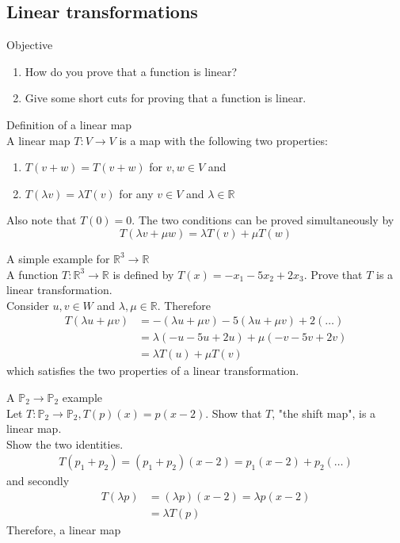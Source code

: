 \documentclass[journal, letterpaper]{IEEEtran}
\begin{document}
    \subsection{Linear transformations}
    \begin{mybox}{Objective}
        \begin{enumerate}
            \item How do you prove that a function is linear?
            \item Give some short cuts for proving that a function is linear.
        \end{enumerate}
    \end{mybox}
    \begin{mybox}{Definition of a linear map} \\ 
        A linear map $T : V \to V$ is a map with the following two properties:
        \begin{enumerate}
            \item $T(v + w) = T(v + w)$ for $v, w  \in V$ and
            \item $T(\lambda v) = \lambda T(v)$ for any $v \in V$ and $\lambda \in \mathbb{R}$
        \end{enumerate}
        Also note that $T(0) = 0$. The two conditions can be proved simultaneously by
        $$ T(\lambda v + \mu w) = \lambda T(v) + \mu T(w)$$
    \end{mybox}
    \newpage
    \begin{myboxg}{A simple example for $\mathbb{R}^3 \to \mathbb{R}$} \\ 
        A function $T : \mathbb{R}^3 \to \mathbb{R}$ is defined by $T(x) = -x_1 - 5x_2 + 2x_3$. Prove that $T$ is a linear transformation.
        \newline \\ 
        Consider $u, v \in W$ and $\lambda, \mu \in \mathbb{R}$. Therefore
        \begin{align*}
    T(\lambda u + \mu v) &= -(\lambda u + \mu v) -5(\lambda u + \mu v) + 2(\dots ) \\ 
    &= \lambda(-u - 5u + 2u) + \mu(-v - 5v + 2v) \\
    &= \lambda T(u) + \mu T(v)
        \end{align*}
        which satisfies the two properties of a linear transformation.
    \end{myboxg}
    \begin{myboxg}{A $\mathbb{P}_2 \to \mathbb{P}_2$ example} \\ 
        Let $T : \mathbb{P}_2 \to \mathbb{P}_2, T(p)(x) = p(x - 2)$. Show that $T$, "the shift map", is a linear map.
        \newline \\
        Show the two identities.
        \begin{align*}
            T(p_1 + p_2) = (p_1 + p_2)(x - 2) = p_1(x - 2) + p_2(\dots)
        \end{align*}
        and secondly
        \begin{align*}
            T(\lambda p) &= (\lambda p)(x-2) = \lambda p(x - 2) \\
            &= \lambda T(p)
        \end{align*}
        Therefore, a linear map
    \end{myboxg}
\end{document}
